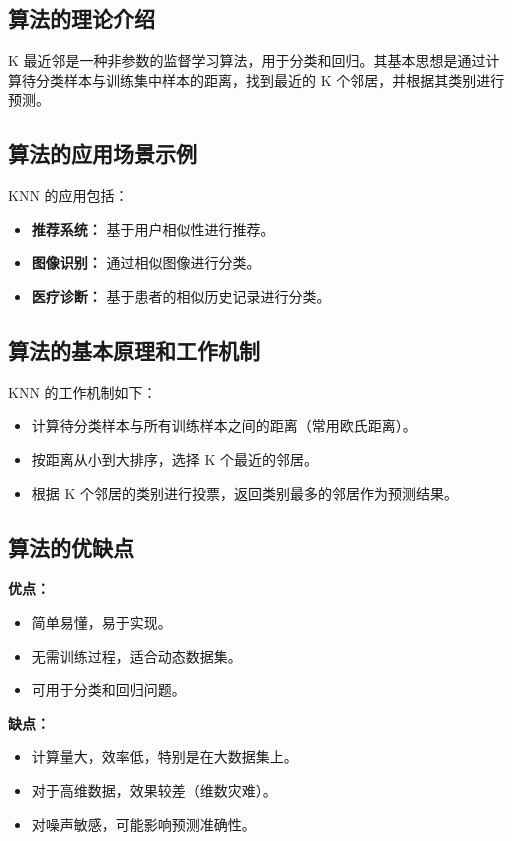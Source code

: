 \subsection*{算法的理论介绍}
K 最近邻是一种非参数的监督学习算法，用于分类和回归。其基本思想是通过计算待分类样本与训练集中样本的距离，找到最近的 K 个邻居，并根据其类别进行预测。

\subsection*{算法的应用场景示例}
KNN 的应用包括：
\begin{itemize}
    \item \textbf{推荐系统：} 基于用户相似性进行推荐。
    \item \textbf{图像识别：} 通过相似图像进行分类。
    \item \textbf{医疗诊断：} 基于患者的相似历史记录进行分类。
\end{itemize}

\subsection*{算法的基本原理和工作机制}
KNN 的工作机制如下：
\begin{itemize}
    \item 计算待分类样本与所有训练样本之间的距离（常用欧氏距离）。
    \item 按距离从小到大排序，选择 K 个最近的邻居。
    \item 根据 K 个邻居的类别进行投票，返回类别最多的邻居作为预测结果。
\end{itemize}

\subsection*{算法的优缺点}
\textbf{优点：}
\begin{itemize}
    \item 简单易懂，易于实现。
    \item 无需训练过程，适合动态数据集。
    \item 可用于分类和回归问题。
\end{itemize}

\textbf{缺点：}
\begin{itemize}
    \item 计算量大，效率低，特别是在大数据集上。
    \item 对于高维数据，效果较差（维数灾难）。
    \item 对噪声敏感，可能影响预测准确性。
\end{itemize}

